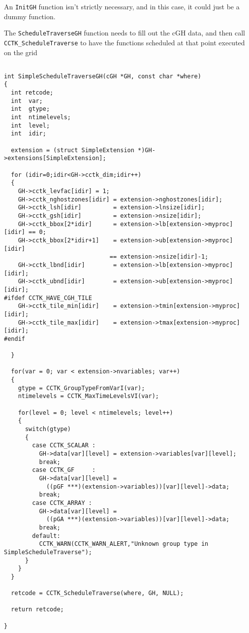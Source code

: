 An {\tt InitGH} function isn't strictly necessary, and in this case, it could
just be a dummy function.

The {\tt ScheduleTraverseGH} function needs to fill out the cGH data, and
then call {\tt CCTK\_ScheduleTraverse} to have the functions scheduled at
that point executed on the grid

\begin{verbatim}

int SimpleScheduleTraverseGH(cGH *GH, const char *where)
{
  int retcode;
  int  var;
  int  gtype;
  int  ntimelevels;
  int  level;
  int  idir;

  extension = (struct SimpleExtension *)GH->extensions[SimpleExtension];

  for (idir=0;idir<GH->cctk_dim;idir++)
  {
    GH->cctk_levfac[idir] = 1;
    GH->cctk_nghostzones[idir] = extension->nghostzones[idir];
    GH->cctk_lsh[idir]         = extension->lnsize[idir];
    GH->cctk_gsh[idir]         = extension->nsize[idir];
    GH->cctk_bbox[2*idir]      = extension->lb[extension->myproc][idir] == 0;
    GH->cctk_bbox[2*idir+1]    = extension->ub[extension->myproc][idir]
                              == extension->nsize[idir]-1;
    GH->cctk_lbnd[idir]        = extension->lb[extension->myproc][idir];
    GH->cctk_ubnd[idir]        = extension->ub[extension->myproc][idir];
#ifdef CCTK_HAVE_CGH_TILE
    GH->cctk_tile_min[idir]    = extension->tmin[extension->myproc][idir];
    GH->cctk_tile_max[idir]    = extension->tmax[extension->myproc][idir];
#endif

  }

  for(var = 0; var < extension->nvariables; var++)
  {
    gtype = CCTK_GroupTypeFromVarI(var);
    ntimelevels = CCTK_MaxTimeLevelsVI(var);

    for(level = 0; level < ntimelevels; level++)
    {
      switch(gtype)
      {
        case CCTK_SCALAR :
          GH->data[var][level] = extension->variables[var][level];
          break;
        case CCTK_GF     :
          GH->data[var][level] =
            ((pGF ***)(extension->variables))[var][level]->data;
          break;
        case CCTK_ARRAY :
          GH->data[var][level] =
            ((pGA ***)(extension->variables))[var][level]->data;
          break;
        default:
          CCTK_WARN(CCTK_WARN_ALERT,"Unknown group type in SimpleScheduleTraverse");
      }
    }
  }

  retcode = CCTK_ScheduleTraverse(where, GH, NULL);

  return retcode;

}

\end{verbatim}

